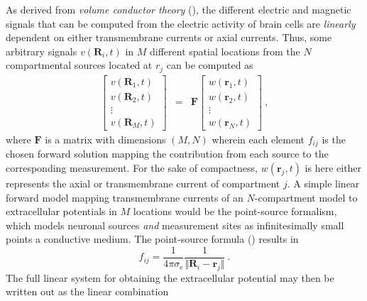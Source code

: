 As derived from \textit{volume conductor theory} (),
the different electric and magnetic signals that can be computed from the electric activity of brain cells are \textit{linearly} dependent on either transmembrane currents or axial currents.
Thus, some arbitrary signals $v(\mathbf{R}_i, t)$ in $M$ different spatial locations from the $N$ compartmental sources located at $r_j$ can be computed as
%
\begin{eqnarray}
\begin{bmatrix}
v(\mathbf{R}_1, t) \\
v(\mathbf{R}_2, t) \\
\vdots \\
v(\mathbf{R}_M, t)
\end{bmatrix}
&=& \mathbf{F}
\begin{bmatrix}
w(\mathbf{r}_1, t) \\
w(\mathbf{r}_2, t) \\
\vdots \\
w(\mathbf{r}_N, t)
\end{bmatrix} ~,
\end{eqnarray}
%
where $\mathbf{F}$ is a matrix with dimensions $(M, N)$ wherein each element $f_{ij}$ is the chosen forward solution mapping the contribution from each source to the corresponding measurement.
For the sake of compactness, $w(\mathbf{r}_j, t)$ is here either represents the axial or transmembrane current of compartment $j$. 
A simple linear forward model mapping transmembrane currents of an $N$-compartment model to extracellular potentials in $M$ locations would be the point-source formalism,
which models neuronal sources \textit{and} measurement sites as infinitesimally small points a conductive medium.
The point-source formula () results in
%
\begin{equation}
f_{ij} = \frac{1}{4\pi\sigma_\mathrm{e}}\frac{1}{\Vert\mathbf{R}_i - \mathbf{r}_j\Vert}  ~.
\end{equation}
%
The full linear system for obtaining the extracellular potential may then be written out as the linear combination
%
